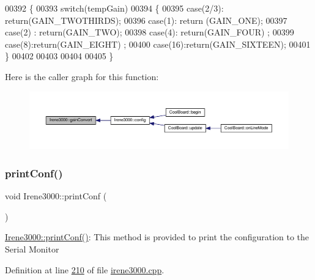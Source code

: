 \begin{DoxyCode}
00392 \{
00393     \textcolor{keywordflow}{switch}(tempGain)
00394     \{
00395         \textcolor{keywordflow}{case}(2/3): \textcolor{keywordflow}{return}(GAIN\_TWOTHIRDS);
00396         \textcolor{keywordflow}{case}(1): \textcolor{keywordflow}{return} (GAIN\_ONE);
00397         \textcolor{keywordflow}{case}(2) : \textcolor{keywordflow}{return}(GAIN\_TWO);
00398         \textcolor{keywordflow}{case}(4): \textcolor{keywordflow}{return}(GAIN\_FOUR) ;   
00399         \textcolor{keywordflow}{case}(8):\textcolor{keywordflow}{return}(GAIN\_EIGHT)  ;  
00400         \textcolor{keywordflow}{case}(16):\textcolor{keywordflow}{return}(GAIN\_SIXTEEN);  
00401     \}
00402 
00403 
00404 
00405 \}
\end{DoxyCode}
Here is the caller graph for this function\+:\nopagebreak
\begin{figure}[H]
\begin{center}
\leavevmode
\includegraphics[width=350pt]{class_irene3000_abcad62d1201a59f8dd3ba87048002728_icgraph}
\end{center}
\end{figure}
\mbox{\label{class_irene3000_a7bc2414100b5e19eacc6630fa34b2654}} 
\subsubsection{\texorpdfstring{print\+Conf()}{printConf()}}
{\footnotesize\ttfamily void Irene3000\+::print\+Conf (\begin{DoxyParamCaption}{ }\end{DoxyParamCaption})}

\hyperlink{class_irene3000_a7bc2414100b5e19eacc6630fa34b2654}{Irene3000\+::print\+Conf()}\+: This method is provided to print the configuration to the Serial Monitor 

Definition at line \hyperlink{irene3000_8cpp_source_l00210}{210} of file \hyperlink{irene3000_8cpp_source}{irene3000.\+cpp}.



